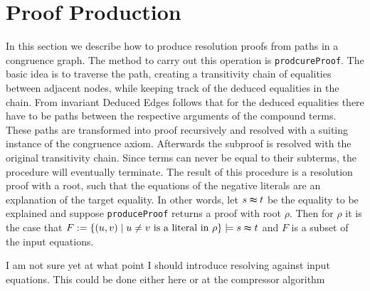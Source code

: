 \section*{Proof Production}
\label{sec:proofproduction}

In this section we describe how to produce resolution proofs from paths in a congruence graph.
The method to carry out this operation is \texttt{prodcureProof}.
The basic idea is to traverse the path, creating a transitivity chain of equalities between adjacent nodes, while keeping track of the deduced equalities in the chain.
From invariant Deduced Edges follows that for the deduced equalities there have to be paths between the respective arguments of the compound terms.
These paths are transformed into proof recursively and resolved with a suiting instance of the congruence axiom.
Afterwards the subproof is resolved with the original transitivity chain.
Since terms can never be equal to their subterms, the procedure will eventually terminate.
The result of this procedure is a resolution proof with a root, such that the equations of the negative literals are an explanation of the target equality.
In other words, let $s \thickapprox t$ be the equality to be explained and suppose \texttt{produceProof} returns a proof with root $\rho$.
Then for $\rho$ it is the case that $F := \{(u,v) \mid u \neq v \text{ is a literal in } \rho\} \models s \thickapprox t$ and $F$ is a subset of the input equations.

{\color{blue} I am not sure yet at what point I should introduce resolving against input equations. This could be done either here or at the compressor algorithm}




